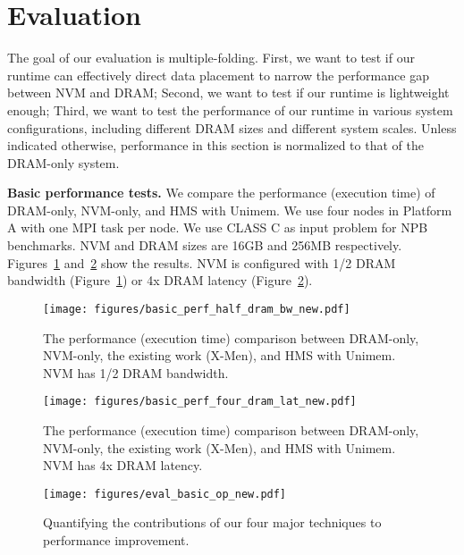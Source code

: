 \vspace*{5pt}
\section{Evaluation}
\label{sec:eva}
The goal of our evaluation is multiple-folding. 
First, we want to test if our runtime can effectively direct data placement
to narrow the performance gap between NVM and DRAM;
Second, we want to test if our runtime is lightweight enough;
Third, we want to test the performance of our runtime 
in various system configurations, including different DRAM sizes
and different system scales.
Unless indicated otherwise, performance in this section is normalized to 
that of the DRAM-only system.

\textbf{Basic performance tests.} 
We compare the performance (execution time) of DRAM-only, NVM-only, and HMS with Unimem. We use four nodes in Platform A with one MPI task per node. 
We use CLASS C as input problem for NPB benchmarks. NVM and DRAM sizes are 16GB and 256MB respectively.
Figures~\ref{fig:eval_basic_perf_half_dram_bw} and~\ref{fig:eval_basic_perf_four_dram_lat} show the results. 
NVM is configured with 1/2 DRAM bandwidth (Figure~\ref{fig:eval_basic_perf_half_dram_bw}) or 4x DRAM latency (Figure~\ref{fig:eval_basic_perf_four_dram_lat}). 

\begin{figure}[!t]
    \centering
    \texttt{[image: figures/basic\_perf\_half\_dram\_bw\_new.pdf]}
     \vspace{-20pt}
    \caption{The performance (execution time) comparison between DRAM-only, NVM-only, the existing work (X-Men), and HMS with Unimem. NVM has 1/2 DRAM bandwidth.}
    \label{fig:eval_basic_perf_half_dram_bw}
    \vspace{-10pt}
\end{figure}

\begin{figure}[!t]
    \centering
    \texttt{[image: figures/basic\_perf\_four\_dram\_lat\_new.pdf]}
     \vspace{-20pt}
    \caption{The performance (execution time) comparison between DRAM-only, NVM-only, the existing work (X-Men), and HMS with Unimem. NVM has 4x DRAM latency.}
    \label{fig:eval_basic_perf_four_dram_lat}
    \vspace{-10pt}
\end{figure}

\begin{figure}[!t]
    \centering
    \texttt{[image: figures/eval\_basic\_op\_new.pdf]}
     \vspace{-20pt}
    \caption{Quantifying the contributions of our four major techniques to performance improvement.}
    \label{fig:eval_basic_op}
    \vspace{-10pt}
\end{figure}

